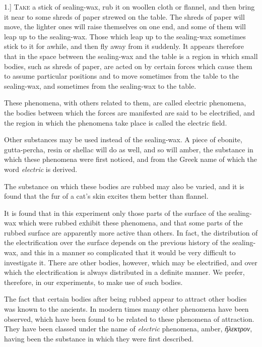 \documentclass[12pt,oneside]{book}[2021/10/04]
\newcommand{\article}[1]{\phantomsection \label{art:#1}{#1.]}}
\newcommand{\¬}{\hphantom{0}}
\begin{document}
\article{1}
\textsc{Take} a stick of sealing-wax, rub it on woollen cloth or
flannel, and then bring it near to some shreds of paper strewed on
the table. The shreds of paper will move, the lighter ones will
raise themselves on one end, and some of them will leap up to the
sealing-wax. Those which leap up to the sealing-wax sometimes
stick to it for awhile, and then fly away from it suddenly. It
appears therefore that in the space between the sealing-wax and
the table is a region in which small bodies, such as shreds of paper,
are acted on by certain forces which cause them to assume particular
positions and to move sometimes from the table to the
sealing-wax, and sometimes from the sealing-wax to the table.

These phenomena, with others related to them, are called electric
phenomena, the bodies between which the forces are manifested are
said to be electrified, and the region in which the phenomena take
place is called the electric field.

Other substances may be used instead of the sealing-wax. A
piece of ebonite, gutta-percha, resin or shellac will do as well, and
so will amber, the substance in which these phenomena were first
noticed, and from the Greek name of which the word \textit{electric} is
derived.

The substance on which these bodies are rubbed may also be
varied, and it is found that the fur of a cat's skin excites them
better than flannel.

It is found that in this experiment only those parts of the
surface of the sealing-wax which were rubbed exhibit these phenomena,
and that some parts of the rubbed surface are apparently
more active than others. In fact, the distribution of the electrification
over the surface depends on the previous history of the
sealing-wax, and this in a manner so complicated that it would be
very difficult to investigate it. There are other bodies, however,
which may be electrified, and over which the electrification is
always distributed in a definite manner. We prefer, therefore, in
our experiments, to make use of such bodies.

The fact that certain bodies after being rubbed appear to attract
other bodies was known to the ancients. In modern times many
other phenomena have been observed, which have been found to be
related to these phenomena of attraction. They have been classed
under the name of \textit{electric} phenomena, amber, {\greekfont \textit{ἤλεκτρον}}, having
been the substance in which they were first described.
\end{document}
